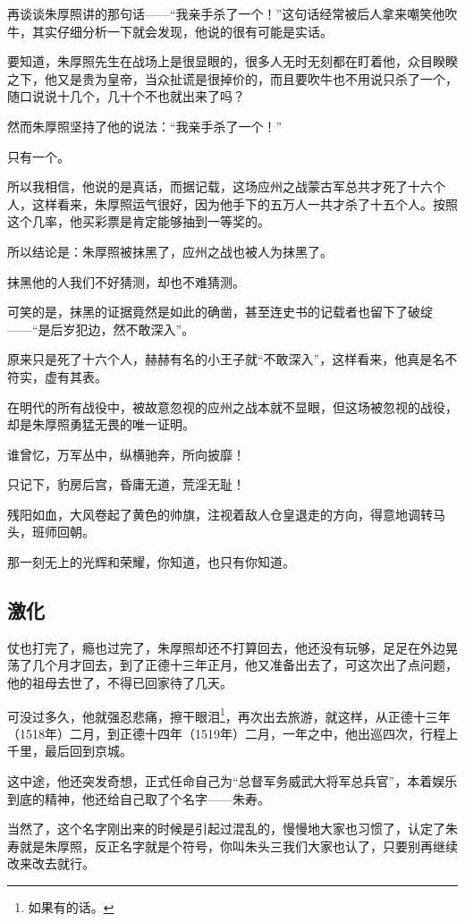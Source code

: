 \begin{multicols}{\theparacolNo}
再谈谈朱厚照讲的那句话——“我亲手杀了一个！”这句话经常被后人拿来嘲笑他吹牛，其实仔细分析一下就会发现，他说的很有可能是实话。

要知道，朱厚照先生在战场上是很显眼的，很多人无时无刻都在盯着他，众目睽睽之下，他又是贵为皇帝，当众扯谎是很掉价的，而且要吹牛也不用说只杀了一个，随口说说十几个，几十个不也就出来了吗？

然而朱厚照坚持了他的说法：“我亲手杀了一个！”

只有一个。

所以我相信，他说的是真话，而据记载，这场应州之战蒙古军总共才死了十六个人，这样看来，朱厚照运气很好，因为他手下的五万人一共才杀了十五个人。按照这个几率，他买彩票是肯定能够抽到一等奖的。

所以结论是：朱厚照被抹黑了，应州之战也被人为抹黑了。

抹黑他的人我们不好猜测，却也不难猜测。

可笑的是，抹黑的证据竟然是如此的确凿，甚至连史书的记载者也留下了破绽——“是后岁犯边，然不敢深入”。

原来只是死了十六个人，赫赫有名的小王子就“不敢深入”，这样看来，他真是名不符实，虚有其表。

在明代的所有战役中，被故意忽视的应州之战本就不显眼，但这场被忽视的战役，却是朱厚照勇猛无畏的唯一证明。

谁曾忆，万军丛中，纵横驰奔，所向披靡！

只记下，豹房后宫，昏庸无道，荒淫无耻！

残阳如血，大风卷起了黄色的帅旗，注视着敌人仓皇退走的方向，得意地调转马头，班师回朝。

那一刻无上的光辉和荣耀，你知道，也只有你知道。

\subsection{激化}
仗也打完了，瘾也过完了，朱厚照却还不打算回去，他还没有玩够，足足在外边晃荡了几个月才回去，到了正德十三年正月，他又准备出去了，可这次出了点问题，他的祖母去世了，不得已回家待了几天。

可没过多久，他就强忍悲痛，擦干眼泪\footnote{如果有的话。}，再次出去旅游，就这样，从正德十三年（1518年）二月，到正德十四年（1519年）二月，一年之中，他出巡四次，行程上千里，最后回到京城。

这中途，他还突发奇想，正式任命自己为“总督军务威武大将军总兵官”，本着娱乐到底的精神，他还给自己取了个名字——朱寿。

当然了，这个名字刚出来的时候是引起过混乱的，慢慢地大家也习惯了，认定了朱寿就是朱厚照，反正名字就是个符号，你叫朱头三我们大家也认了，只要别再继续改来改去就行。


\end{multicols}
